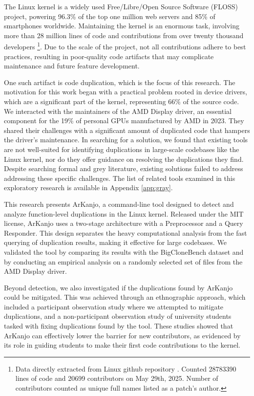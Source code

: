 \en

The Linux kernel is a widely used Free/Libre/Open Source Software (FLOSS) project, 
powering 96.3\% of the top one million web servers and 85\% of smartphones worldwide. 
Maintaining the kernel is an enormous task, involving more than 28 million lines of 
code and contributions from over twenty thousand developers
\footnote{Data directly extracted from Linux github repository \citep{linuxrepo}.
Counted  28783390 lines of code and 20699 contributors on May 29th, 2025.
Number of contributors counted as unique full names listed as a patch's author.}.
Due to the scale of the project, not all contributions adhere to best practices, resulting 
in poor-quality code artifacts that may complicate maintenance and future feature development.

One such artifact is code duplication, which is the focus of this research. The motivation for 
this work began with a practical problem rooted in device drivers, which are a significant part 
of the kernel, representing 66\% of the source code\citep{marcelo}. We interacted with the 
maintainers of the AMD Display driver, an essential component for the 19\% of personal GPUs 
manufactured by AMD in 2023\citep{gpumarket}. They shared their challenges with a significant 
amount of duplicated code that hampers the driver's maintenance. In searching for a solution, 
we found that existing tools are not well-suited for identifying duplications in large-scale 
codebases like the Linux kernel, nor do they offer guidance on resolving the duplications 
they find. Despite searching formal and grey literature, existing solutions failed to address
addressing these specific challenges. The list of related tools examined in this exploratory 
research is available in Appendix \ref{app:gray}.

This research presents ArKanjo, a command-line tool designed to detect and analyze function-level 
duplications in the Linux kernel. Released under the MIT license, ArKanjo uses a two-stage 
architecture with a Preprocessor and a Query Responder. This design separates the heavy 
computational analysis from the fast querying of duplication results, making it effective for 
large codebases. We validated the tool by comparing its results with the BigCloneBench dataset
\citep{bigclonebench} and by conducting an empirical analysis on a randomly selected set of 
files from the AMD Display driver.

Beyond detection, we also investigated if the duplications found by ArKanjo could be mitigated.
This was achieved through an ethnographic approach, which included a participant observation 
study where we attempted to mitigate duplications, and a non-participant observation study of 
university students tasked with fixing duplications found by the tool. These studies showed that 
ArKanjo can effectively lower the barrier for new contributors, as evidenced by its role in 
guiding students to make their first code contributions to the kernel.


